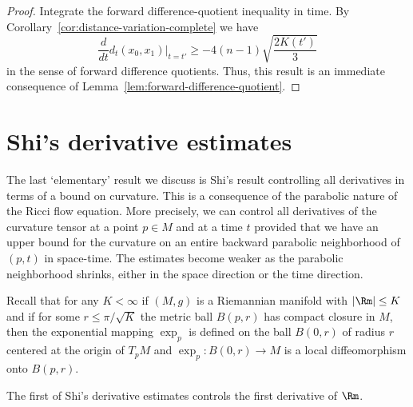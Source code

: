 \begin{proof}
\sketch Integrate the forward difference-quotient inequality in time.
By Corollary~\ref{cor:distance-variation-complete} we have
\begin{equation}\label{liminf}
\frac{d}{dt}d_t(x_0,x_1)|_{t=t'}\ge -4(n-1)\sqrt{\frac{2K(t')}{3}}
\end{equation}
in the sense  of forward difference quotients. Thus, this result is
an immediate consequence of Lemma~\ref{lem:forward-difference-quotient}.
\end{proof}


\section{Shi's derivative estimates}

The last `elementary' result we discuss is Shi's result controlling all derivatives in terms of a
bound on curvature. This is a consequence of the parabolic nature of
the Ricci flow equation. More precisely, we can control all
derivatives of the curvature tensor at a point $p\in M$ and at a
time $t$ provided that we have an upper bound for the curvature on
an entire backward parabolic neighborhood of $(p,t)$ in space-time.
The estimates become weaker as the parabolic neighborhood shrinks,
either in the space direction or the time direction.

Recall that for any $K<\infty$  if $(M,g)$ is a Riemannian manifold
with $|\Rm|\le K$ and if for some $r\le \pi/\sqrt{K}$ the metric ball
$B(p,r)$ has compact closure in $M$, then the exponential mapping
$\exp_p$ is defined on the ball $B(0,r)$ of radius $r$ centered
at the origin of $T_pM$ and $\exp_p\colon B(0,r)\to M$ is a
local diffeomorphism onto $B(p,r)$.


The first of Shi's derivative estimates controls the first
derivative of $\Rm$.

